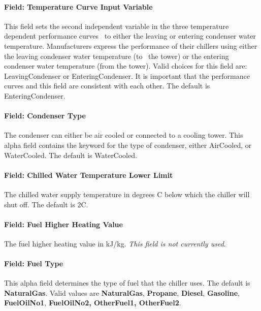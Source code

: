 \paragraph{Field: Temperature Curve Input Variable}\label{field-temperature-curve-input-variable}

This field sets the second independent variable in the three temperature dependent performance curves~ to either the leaving or entering condenser water temperature. Manufacturers express the performance of their chillers using either the leaving condenser water temperature (to~ the tower) or the entering condenser water temperature (from the tower). Valid choices for this field are: LeavingCondenser or EnteringCondenser. It is important that the performance curves and this field are consistent with each other. The default is EnteringCondenser.

\paragraph{Field: Condenser Type}\label{field-condenser-type-5-000}

The condenser can either be air cooled or connected to a cooling tower. This alpha field contains the keyword for the type of condenser, either AirCooled, or WaterCooled. The default is WaterCooled.

\paragraph{Field: Chilled Water Temperature Lower Limit}\label{field-chilled-water-temperature-lower-limit}

The chilled water supply temperature in degrees C below which the chiller will shut off. The default is 2C.

\paragraph{Field: Fuel Higher Heating Value}\label{field-fuel-higher-heating-value-2-000}

The fuel higher heating value in kJ/kg. \emph{This field is not currently used}.

\paragraph{Field: Fuel Type}\label{field-fuel-type-2-000}

This alpha field determines the type of fuel that the chiller uses. The default is \textbf{NaturalGas}. Valid values are \textbf{NaturalGas}, \textbf{Propane}, \textbf{Diesel}, \textbf{Gasoline}, \textbf{FuelOilNo1}, \textbf{FuelOilNo2, OtherFuel1, OtherFuel2}.

